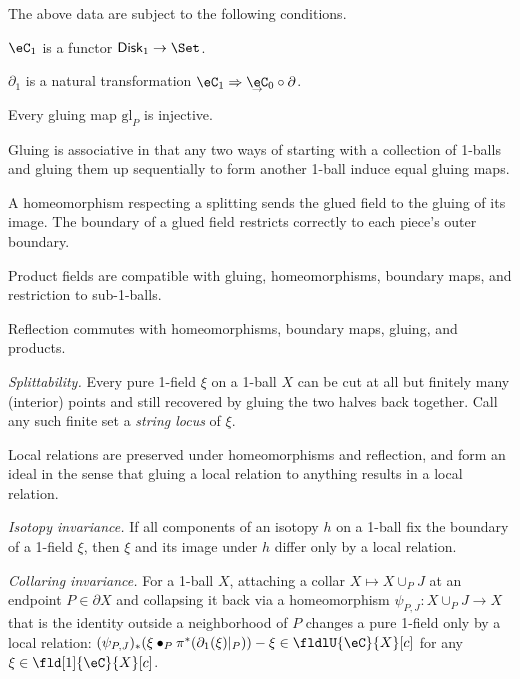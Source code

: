 \documentclass[12pt,reqno]{amsart}
\newcommand{\glu}{\mathrm{gl}}
\newcommand{\Disk}{\mathsf{Disk}}
\newcommand{\C}{\eC}
\newcommand{\blt}{\bullet}
\newcommand{\fcj}[1]{\overline{#1}}
\newcommand{\defn}[1]{\emph{#1}}
\newcommand{\undCtemp}{\bgroup\smash[b]{\text{$\underset{\smash{\raisebox{.225em}{$\scriptstyle\kern.05ex\rightarrow$}}}{\smash{\C}}$}}\egroup}
\newcommand{\undC}{\vphantom{\C}{\undCtemp}}
\begin{document}
The above data are subject to the following conditions.
\begin{lst}
\item[(C$\varphi$)]\label{Cvarphi1} $\C_1$ is a functor $\Disk_1\to\Set$.
\item[(C$\partial$)]\label{Cbdy1} $\partial_1$ is a natural transformation $\C_1\Rightarrow\undC_0\circ\partial$.
\item[(CGi)]\label{CGi1} Every gluing map $\glu_P$ is injective.
\item[(CGa)]\label{CGa1} Gluing is associative in that any two ways of starting with a collection of 1-balls and gluing them up sequentially to form another 1-ball induce equal gluing maps.
\item[(CG)]\label{CGvarphi1} A homeomorphism respecting a splitting sends the glued field to the gluing of its image. The boundary of a glued field restricts correctly to each piece's outer boundary.
\item[(C$\pi$)]\label{Cpi1} Product fields are compatible with gluing, homeomorphisms, boundary maps, and restriction to sub-1-balls.
\item[(C$\fcj{\,\cdot\,}$)]\label{Cfcj1} Reflection commutes with homeomorphisms, boundary maps, gluing, and products.
\item[(CS)]\label{CS1} \emph{Splittability.} Every pure 1-field $\xi$ on a 1-ball $X$ can be cut at all but finitely many (interior) points and still recovered by gluing the two halves back together. Call any such finite set a \defn{string locus} of $\xi$.
\item[(C$U$)]\label{CU1} Local relations are preserved under homeomorphisms and reflection, and form an ideal in the sense that gluing a local relation to anything results in a local relation.
\item[(C$U$i)]\label{CTi1} \emph{Isotopy invariance.} If all components of an isotopy $h$ on a 1-ball fix the boundary of a 1-field $\xi$, then $\xi$ and its image under $h$ differ only by a local relation.
\item[(C$U$c)]\label{CTc1} \emph{Collaring invariance.} For a 1-ball $X$, attaching a collar $X\mapsto X\cup_P J$ at an endpoint $P\in\partial X$ and collapsing it back via a homeomorphism $\psi_{P,J}\colon X\cup_P J\to X$ that is the identity outside a neighborhood of $P$ changes a pure 1-field only by a local relation: $(\psi_{P,J})_*(\xi\blt_P\pi^*(\partial_1(\xi)|_P))-\xi\in\fldlU{\C}{X}[c]$ for any $\xi\in\fld[1]{\C}{X}[c]$.
\end{lst}
\end{document}
